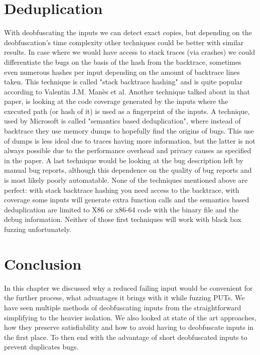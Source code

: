 \section{Deduplication}
\label{inputReduction:Deduplication}
With deobfuscating the inputs we can detect exact copies, but depending on the deobfuscation's time complexity other techniques could be better with similar results. In case where we would have access to stack traces (via crashes) we could differentiate the bugs on the basis of the hash from the backtrace, sometimes even numerous hashes per input depending on the amount of backtrace lines taken. This technique is called "stack backtrace hashing" and is quite popular according to Valentin J.M. Man\`es et al. \cite{13manes2019survey} 
Another technique talked about in that paper, is looking at the code coverage generated by the inputs where the executed path (or hash of it) is used as a fingerprint of the inputs. A technique, used by Microsoft \cite{36semanticsAwareDeduplicationRETracer} is called "semantics based deduplication", where instead of backtrace they use memory dumps to hopefully find the origins of bugs. This use of dumps is less ideal due to traces having more information, but the latter is not always possible due to the performance overhead and privacy causes as specified in the paper. 
A last technique would be looking at the bug description left by manual bug reports, although this dependence on the quality of bug reports and is most likely poorly automatable. 
None of the techniques mentioned above are perfect: with stack backtrace hashing you need access to the backtrace, with coverage some inputs will generate extra function calls and the semantics based deduplication are limited to X86 or x86-64 code with the binary file and the debug information. Neither of those first techniques will work with black box fuzzing unfortunately.

\section{Conclusion}
\label{inputReduction:Conclusion}
In this chapter we discussed why a reduced failing input would be convenient for the further process, what advantages it brings with it while fuzzing PUTs. We have seen multiple methods of deobfuscating inputs from the straightforward simplifying to the heavier isolation. We also looked at state of the art approaches, how they preserve satisfiability and how to avoid having to deobfuscate inputs in the first place. To then end with the advantage of short deobfuscated inputs to prevent duplicates bugs.

